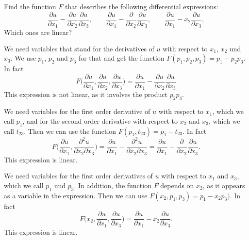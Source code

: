 Find the function $F$ that describes the following differential
expressions:
\[
\frac{\partial u}{\partial x_1}
-
\frac{\partial u}{\partial x_2}
\frac{\partial u}{\partial x_3},
\qquad
\frac{\partial u}{\partial x_1}
-
\frac{\partial }{\partial x_2}
\frac{\partial u}{\partial x_3},
\qquad
\frac{\partial u}{\partial x_1}
-
x_2
\frac{\partial u}{\partial x_3},
\]
Which ones are linear?

\begin{loesung}
\begin{teilaufgaben}
\item
We need variables that stand for the derivatives of $u$
with respect to $x_1$, $x_2$ und $x_3$.
We use $p_1$, $p_2$ and $p_3$ for that and get the function
$F(p_1,p_2,p_3)=p_1-p_2p_3$.
In fact
\[
F\biggl(
\frac{\partial u}{\partial x_1},
\frac{\partial u}{\partial x_2},
\frac{\partial u}{\partial x_3}
\biggr)
=
\frac{\partial u}{\partial x_1}
-
\frac{\partial u}{\partial x_2}
\frac{\partial u}{\partial x_3}
\]
This expression is not linear, as it involves the product $p_2p_3$.
\item We need variables for the first order derivative of $u$ with
respect to $x_1$, which we call $p_1$, and for the second order
derivative with respect to $x_2$ and $x_3$, which we call $t_{23}$.
Then we can use the function $F(p_1,t_{23}) = p_1-t_{23}$.
In fact
\[
F\biggl(
\frac{\partial u}{\partial x_1},
\frac{\partial^2 u}{\partial x_2\partial x_3}
\biggr)
=
\frac{\partial u}{\partial x_1}
-
\frac{\partial^2 u}{\partial x_2\partial x_3}
=
\frac{\partial u}{\partial x_1}
-
\frac{\partial}{\partial x_2}
\frac{\partial u}{\partial x_3}.
\]
This expression is linear.
\item
We need variables for the first order derivatives of $u$ with
respect to $x_1$ and $x_3$, which we call $p_1$ und $p_3$.
In addition, the function $F$ depends on $x_2$, as it appears as a
variable in the expression.
Then we can use $F(x_2,p_1,p_3)=p_1-x_2p_3)$.
In fact
\[
F\biggl(
x_2,
\frac{\partial u}{\partial x_1},
\frac{\partial u}{\partial x_3}
\biggr)
=
\frac{\partial u}{\partial x_1}
-
x_2
\frac{\partial u}{\partial x_3}.
\]
This expression is linear.
\qedhere
\end{teilaufgaben}
\end{loesung}
